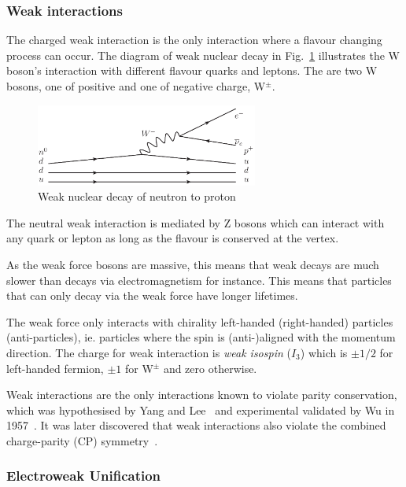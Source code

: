 \subsubsection{Weak interactions}

The charged weak interaction is the only interaction where a flavour changing process can occur. The diagram of weak nuclear decay in Fig.~\ref{fig:QEDvertex} illustrates the W boson's interaction with different flavour quarks and leptons. The are two W bosons, one of positive and one of negative charge, W$^{\pm}$.


\begin{figure}[ht!]
\begin{center}
    \includegraphics[width=0.65\textwidth]{images/Theory/weakDecay.png}
    \caption{Weak nuclear decay of neutron to proton}
    \label{fig:QEDvertex}
\end{center}
\end{figure}

The neutral weak interaction is mediated by Z bosons which can interact with any quark or lepton as long as the flavour is conserved at the vertex.

As the weak force bosons are massive, this means that weak decays are much slower than decays via electromagnetism for instance. This means that particles that can only decay via the weak force have longer lifetimes. 

The weak force only interacts with chirality left-handed (right-handed) particles (anti-particles), ie. particles where the spin is (anti-)aligned with the momentum direction. The charge for weak interaction is \emph{weak isospin} ($I_{3}$) which is $\pm1/2$ for left-handed fermion, $\pm1$ for W$^{\pm}$ and zero otherwise.

Weak interactions are the only interactions known to violate parity conservation, which was hypothesised by Yang and Lee~\cite{PhysRev.104.254} and experimental validated by Wu in 1957~\cite{PhysRev.105.1413}. It was later discovered that weak interactions also violate the combined charge-parity (CP) symmetry~\cite{Cronin2012,PhysRevLett.13.138}.

\subsubsection{Electroweak Unification}

